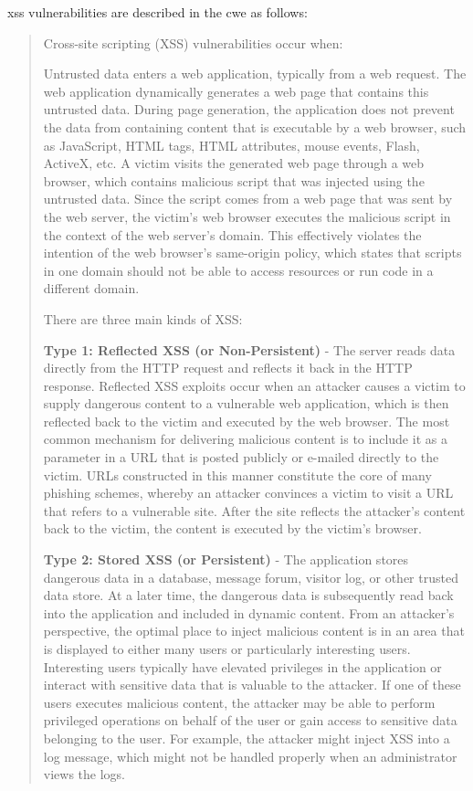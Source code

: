 \acrlong{xss} vulnerabilities are described in the \acrfull{cwe} as follows:
\begin{quote}
	Cross-site scripting (XSS) vulnerabilities occur when:

	Untrusted data enters a web application, typically from a web request.
	The web application dynamically generates a web page that contains this untrusted data.
	During page generation, the application does not prevent the data from containing content that is executable by a web browser, such as JavaScript, HTML tags, HTML attributes, mouse events, Flash, ActiveX, etc.
	A victim visits the generated web page through a web browser, which contains malicious script that was injected using the untrusted data.
	Since the script comes from a web page that was sent by the web server, the victim's web browser executes the malicious script in the context of the web server's domain.
	This effectively violates the intention of the web browser's same-origin policy, which states that scripts in one domain should not be able to access resources or run code in a different domain.

	There are three main kinds of XSS:

	\textbf{Type 1: Reflected XSS (or Non-Persistent)} - The server reads data directly from the HTTP request and reflects it back in the HTTP response. Reflected XSS exploits occur when an attacker causes a victim to supply dangerous content to a vulnerable web application, which is then reflected back to the victim and executed by the web browser. The most common mechanism for delivering malicious content is to include it as a parameter in a URL that is posted publicly or e-mailed directly to the victim. URLs constructed in this manner constitute the core of many phishing schemes, whereby an attacker convinces a victim to visit a URL that refers to a vulnerable site. After the site reflects the attacker's content back to the victim, the content is executed by the victim's browser.

	\textbf{Type 2: Stored XSS (or Persistent)} - The application stores dangerous data in a database, message forum, visitor log, or other trusted data store. At a later time, the dangerous data is subsequently read back into the application and included in dynamic content. From an attacker's perspective, the optimal place to inject malicious content is in an area that is displayed to either many users or particularly interesting users. Interesting users typically have elevated privileges in the application or interact with sensitive data that is valuable to the attacker. If one of these users executes malicious content, the attacker may be able to perform privileged operations on behalf of the user or gain access to sensitive data belonging to the user. For example, the attacker might inject XSS into a log message, which might not be handled properly when an administrator views the logs.


\end{quote}
